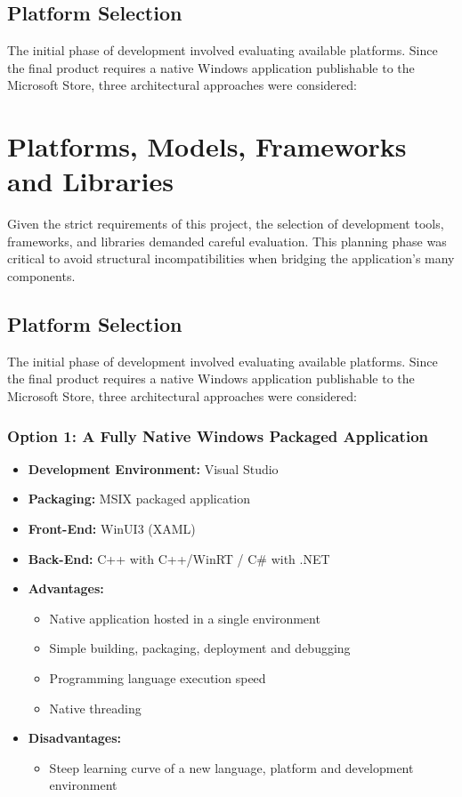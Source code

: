 \subsection{Platform Selection}
The initial phase of development involved evaluating available platforms. Since the final product requires a native Windows application publishable to the Microsoft Store, three architectural approaches were considered:

\section{Platforms, Models, Frameworks and Libraries}
Given the strict requirements of this project, the selection of development tools, frameworks, and libraries demanded careful evaluation. This planning phase was critical to avoid structural incompatibilities when bridging the application's many components. 

\subsection{Platform Selection}
The initial phase of development involved evaluating available platforms. Since the final product requires a native Windows application publishable to the Microsoft Store, three architectural approaches were considered:

\subsubsection{Option 1: A Fully Native Windows Packaged Application}
\begin{itemize}
    \item \textbf{Development Environment:} Visual Studio
    \item \textbf{Packaging:} MSIX packaged application
    \item \textbf{Front-End:} WinUI3 (XAML)
    \item \textbf{Back-End:} C++ with C++/WinRT / C\# with .NET
    \item \textbf{Advantages:}
    \begin{itemize}
        \item Native application hosted in a single environment
        \item Simple building, packaging, deployment and debugging
        \item Programming language execution speed
        \item Native threading
    \end{itemize}
    \item \textbf{Disadvantages:}
    \begin{itemize}
        \item Steep learning curve of a new language, platform and development environment
    \end{itemize}
\end{itemize}


